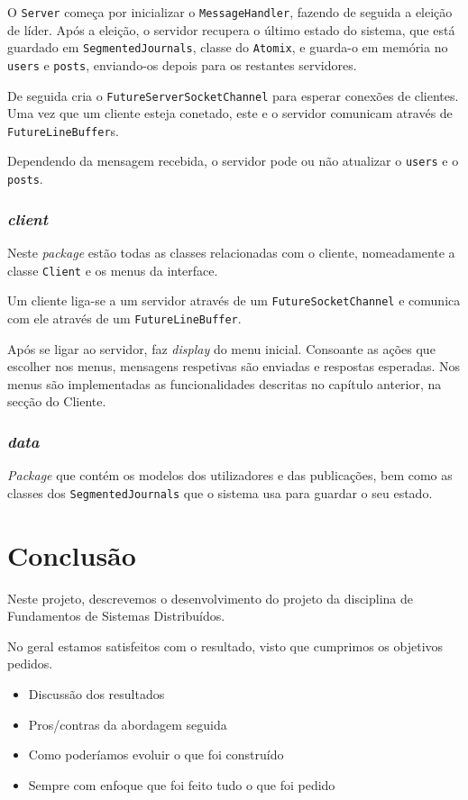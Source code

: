 \documentclass[12pt, a4paper]{report}
\begin{document}
O \texttt{Server} começa por inicializar o \texttt{MessageHandler}, fazendo de seguida a eleição de líder.
Após a eleição, o servidor recupera o último estado do sistema, que está guardado em \texttt{SegmentedJournals}, classe do \texttt{Atomix}, e guarda-o em memória no \texttt{users} e \texttt{posts}, enviando-os depois para os restantes servidores.

De seguida cria o \texttt{FutureServerSocketChannel} para esperar conexões de clientes.
Uma vez que um cliente esteja conetado, este e o servidor comunicam através de \texttt{FutureLineBuffer}s.

Dependendo da mensagem recebida, o servidor pode ou não atualizar o \texttt{users} e o \texttt{posts}.



\subsection{\textit{client}}
Neste \textit{package} estão todas as classes relacionadas com o cliente, nomeadamente a classe \texttt{Client} e os menus da interface.

Um cliente liga-se a um servidor através de um \texttt{FutureSocketChannel} e comunica com ele através de um \texttt{FutureLineBuffer}.

Após se ligar ao servidor, faz \textit{display} do menu inicial.
Consoante as ações que escolher nos menus, mensagens respetivas são enviadas e respostas esperadas.
Nos menus são implementadas as funcionalidades descritas no capítulo anterior, na secção do Cliente.


\subsection{\textit{data}}
\textit{Package} que contém os modelos dos utilizadores e das publicações, bem como as classes dos \texttt{SegmentedJournals} que o sistema usa para guardar o seu estado.


\chapter{Conclusão}
Neste projeto, descrevemos o desenvolvimento do projeto da disciplina de Fundamentos de Sistemas Distribuídos.

No geral estamos satisfeitos com o resultado, visto que cumprimos os objetivos pedidos.

\begin{itemize}
    \item Discussão dos resultados
    \item Pros/contras da abordagem seguida
    \item Como poderíamos evoluir o que foi construído
    \item Sempre com enfoque que foi feito tudo o que foi pedido
\end{itemize}
\end{document}
